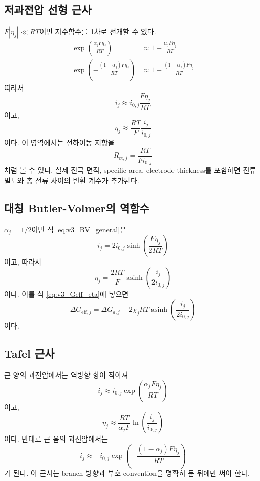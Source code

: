 \documentclass[11pt,a4paper]{article}
\newcommand{\eff}{\mathrm{eff}}
\begin{document}
\subsection{저과전압 선형 근사}
\(F|\eta_j|\ll RT\)이면 지수함수를 1차로 전개할 수 있다.
\begin{align}
\exp\left(\frac{\alpha_jF\eta_j}{RT}\right)&\approx 1+\frac{\alpha_jF\eta_j}{RT} \\
\exp\left(-\frac{(1-\alpha_j)F\eta_j}{RT}\right)&\approx 1-\frac{(1-\alpha_j)F\eta_j}{RT}
\end{align}
따라서
\begin{equation}
i_j\approx i_{0,j}\frac{F\eta_j}{RT}
\label{eq:v3_low_eta}
\end{equation}
이고,
\begin{equation}
\eta_j\approx \frac{RT}{F}\frac{i_j}{i_{0,j}}
\label{eq:v3_low_eta_inv}
\end{equation}
이다. 이 영역에서는 전하이동 저항을
\begin{equation}
R_{\mathrm{ct},j}=\frac{RT}{F i_{0,j}}
\end{equation}
처럼 볼 수 있다. 실제 전극 면적, specific area, electrode thickness를 포함하면 전류밀도와 총 전류 사이의 변환 계수가 추가된다.

\subsection{대칭 Butler-Volmer의 역함수}
\(\alpha_j=1/2\)이면 식 \eqref{eq:v3_BV_general}은
\begin{equation}
i_j=2i_{0,j}\sinh\left(\frac{F\eta_j}{2RT}\right)
\end{equation}
이고, 따라서
\begin{equation}
\eta_j=\frac{2RT}{F}\operatorname{asinh}\left(\frac{i_j}{2i_{0,j}}\right)
\label{eq:v3_asinh_eta}
\end{equation}
이다. 이를 식 \eqref{eq:v3_Geff_eta}에 넣으면
\begin{equation}
\Delta G_{\eff,j}=\Delta G_{a,j}-2\chi_jRT\operatorname{asinh}\left(\frac{i_j}{2i_{0,j}}\right)
\label{eq:v3_Geff_asinh}
\end{equation}
이다.

\subsection{Tafel 근사}
큰 양의 과전압에서는 역방향 항이 작아져
\begin{equation}
i_j\approx i_{0,j}\exp\left(\frac{\alpha_jF\eta_j}{RT}\right)
\end{equation}
이고,
\begin{equation}
\eta_j\approx \frac{RT}{\alpha_jF}\ln\left(\frac{i_j}{i_{0,j}}\right)
\end{equation}
이다. 반대로 큰 음의 과전압에서는
\begin{equation}
i_j\approx -i_{0,j}\exp\left(-\frac{(1-\alpha_j)F\eta_j}{RT}\right)
\end{equation}
가 된다. 이 근사는 branch 방향과 부호 convention을 명확히 둔 뒤에만 써야 한다.
\end{document}
